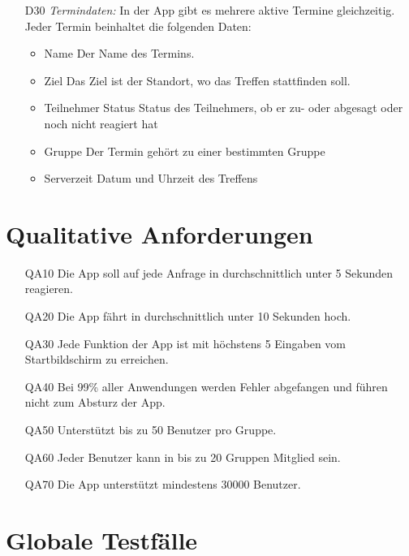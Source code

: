 \documentclass{scrartcl}
\begin{document}
\begin{itemize}
		\item [D30] \textit{Termindaten:}
		In der App gibt es mehrere aktive Termine gleichzeitig. Jeder Termin beinhaltet die folgenden Daten:
		\begin{itemize}
			\item Name
			\newline Der Name des Termins.
			\item Ziel
			\newline Das Ziel ist der Standort, wo das Treffen stattfinden soll.
			\item \gls{Teilnehmer} Status
			\newline Status des Teilnehmers, ob er zu- oder abgesagt oder noch nicht reagiert hat
			\item Gruppe
			\newline Der Termin gehört zu einer bestimmten Gruppe
			\item Serverzeit
			\newline Datum und Uhrzeit des Treffens
		\end{itemize}
	\end{itemize}
	
	\newpage
	
	
	\section{Qualitative Anforderungen}
	\begin{itemize}
		\item[QA10] Die App soll auf jede Anfrage in durchschnittlich unter 5 Sekunden reagieren.
		\item[QA20] Die App fährt in durchschnittlich unter 10 Sekunden hoch.
		\item[QA30] Jede Funktion der App ist mit höchstens 5 Eingaben vom Startbildschirm zu erreichen.
		\item[QA40] Bei 99\% aller Anwendungen werden Fehler abgefangen und führen nicht zum Absturz der App.
		\item[QA50] Unterstützt bis zu 50 Benutzer pro Gruppe.
		\item[QA60] Jeder Benutzer kann in bis zu 20 Gruppen \gls{Mitglied} sein.
		\item[QA70] Die App unterstützt mindestens 30000 Benutzer.
	\end{itemize}
	
	\newpage
	
	
	\section{Globale Testfälle}
\end{document}

